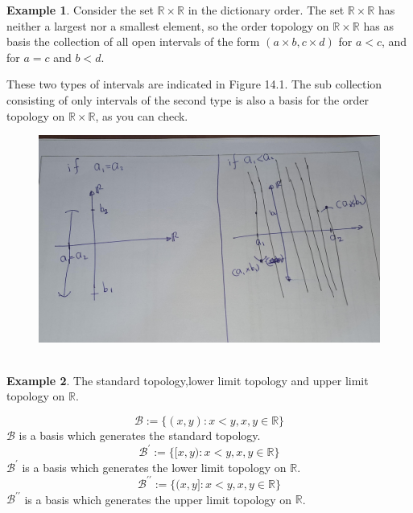 \documentclass[
]{book}
\theoremstyle{definition}
\theoremstyle{definition}
\newtheorem{example}{Example}[chapter]
\theoremstyle{definition}
\theoremstyle{definition}
\theoremstyle{remark}
\begin{document}
\begin{example}
\protect\hypertarget{exm:unnamed-chunk-24}{}\label{exm:unnamed-chunk-24}Consider the set \(\mathbb{R} \times \mathbb{R}\) in the dictionary order. The set \(\mathbb{R} \times \mathbb{R}\) has neither a largest nor a smallest element, so the order topology on \(\mathbb{R} \times \mathbb{R}\) has as basis the collection of all open intervals of the form \((a \times b, c \times d)\) for \(a < c\), and for \(a = c\) and \(b < d\).

These two types of intervals are indicated in Figure 14.1. The sub collection consisting of only intervals of the second type is also a basis for the order topology on \(\mathbb{R} \times \mathbb{R}\), as you can check.
\end{example}

\begin{figure}
\centering
\includegraphics{figures/figure 07.jpg}
\caption{\label{fig:fi7}\(~\)}
\end{figure}

\begin{example}
\protect\hypertarget{exm:unnamed-chunk-25}{}\label{exm:unnamed-chunk-25}The standard topology,lower limit topology and upper limit topology on \(\mathbb{R}\).

\[\mathcal{B}:=\{(x,y):x<y, x,y\in \mathbb{R}\}\]
\(\mathcal{B}\) is a basis which generates the standard topology.
\[\mathcal{B}^\prime:=\{[x,y):x<y, x,y\in \mathbb{R}\}\]
\(\mathcal{B}^\prime\) is a basis which generates the lower limit topology on \(\mathbb{R}\).
\[\mathcal{B}^{\prime \prime}:=\{(x,y]:x<y, x,y\in \mathbb{R}\}\]
\(\mathcal{B}^{\prime \prime}\) is a basis which generates the upper limit topology on \(\mathbb{R}\).
\end{example}
\end{document}
